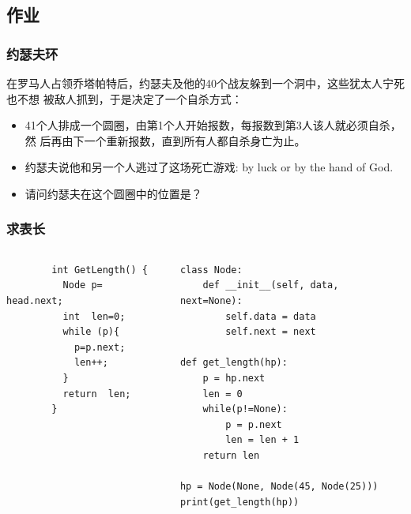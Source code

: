 \subsection{作业}
\begin{frame}[fragile]
  \frametitle{约瑟夫环}

  在罗马人占领乔塔帕特后，约瑟夫及他的40个战友躲到一个洞中，这些犹太人宁死也不想
  被敌人抓到，于是决定了一个自杀方式：

  \begin{itemize}
    \item 41个人排成一个圆圈，由第1个人开始报数，每报数到第3人该人就必须自杀，然
      后再由下一个重新报数，直到所有人都自杀身亡为止。
  \item 约瑟夫说他和另一个人逃过了这场死亡游戏: by luck or by the hand of God.
  \item 请问约瑟夫在这个圆圈中的位置是？
  \end{itemize}
\end{frame}

\begin{frame}[fragile]
  \frametitle{求表长}
  \begin{center}
  \end{center}

  \scriptsize
  \begin{columns}
    \begin{column}[T]{0.5\linewidth}
      \begin{verbatim}
        int GetLength() {
          Node p= head.next;
          int  len=0;
          while (p){
            p=p.next;
            len++;
          }
          return  len;
        }
      \end{verbatim}
    \end{column}
    \begin{column}[T]{0.5\linewidth}
      \pause
      \begin{verbatim}
class Node:
    def __init__(self, data, next=None):
        self.data = data
        self.next = next

def get_length(hp):
    p = hp.next
    len = 0
    while(p!=None):
        p = p.next
        len = len + 1
    return len

hp = Node(None, Node(45, Node(25)))
print(get_length(hp))
      \end{verbatim}
    \end{column}
  \end{columns}
\end{frame}

